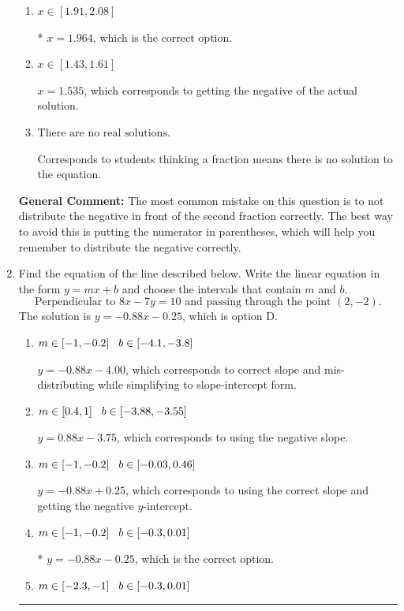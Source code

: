\documentclass{extbook}[14pt]
\newcommand{\litem}[1]{\item #1

\rule{\textwidth}{0.4pt}}
\begin{document}
\begin{enumerate}
{\begin{enumerate}[label=\Alph*.]
$x = 2.144$, which corresponds to not distributing the negative in front of the second parentheses correctly.
\item \( x \in [1.91, 2.08] \)

* $x = 1.964$, which is the correct option.
\item \( x \in [1.43, 1.61] \)

$x = 1.535$, which corresponds to getting the negative of the actual solution.
\item \( \text{There are no real solutions.} \)

Corresponds to students thinking a fraction means there is no solution to the equation.
\end{enumerate}

\textbf{General Comment:} The most common mistake on this question is to not distribute the negative in front of the second fraction correctly. The best way to avoid this is putting the numerator in parentheses, which will help you remember to distribute the negative correctly.
}
\litem{
Find the equation of the line described below. Write the linear equation in the form $ y=mx+b $ and choose the intervals that contain $m$ and $b$.
\[ \text{Perpendicular to } 8 x - 7 y = 10 \text{ and passing through the point } (2, -2). \]The solution is \( y = -0.88x - 0.25 \), which is option D.\begin{enumerate}[label=\Alph*.]
\item \( m \in [-1, -0.2] \hspace*{3mm} b \in [-4.1, -3.8] \)

 $y = -0.88x - 4.00$, which corresponds to correct slope and mis-distributing while simplifying to slope-intercept form.
\item \( m \in [0.4, 1] \hspace*{3mm} b \in [-3.88, -3.55] \)

 $y = 0.88x - 3.75$, which corresponds to using the negative slope.
\item \( m \in [-1, -0.2] \hspace*{3mm} b \in [-0.03, 0.46] \)

 $y = -0.88x + 0.25$, which corresponds to using the correct slope and getting the negative $y$-intercept.
\item \( m \in [-1, -0.2] \hspace*{3mm} b \in [-0.3, 0.01] \)

* $y = -0.88x - 0.25$, which is the correct option.
\item \( m \in [-2.3, -1] \hspace*{3mm} b \in [-0.3, 0.01] \)


\end{enumerate}}
\end{enumerate}
\end{document}
